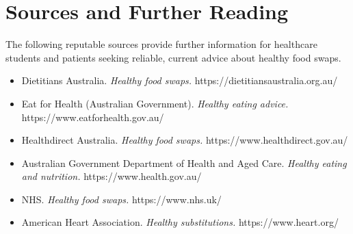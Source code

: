 \section*{Sources and Further Reading}
The following reputable sources provide further information for healthcare students and patients seeking reliable, current advice about healthy food swaps.

\begin{itemize}
    \item Dietitians Australia. \textit{Healthy food swaps.} https://dietitiansaustralia.org.au/
    \item Eat for Health (Australian Government). \textit{Healthy eating advice.} https://www.eatforhealth.gov.au/
    \item Healthdirect Australia. \textit{Healthy food swaps.} https://www.healthdirect.gov.au/
    \item Australian Government Department of Health and Aged Care. \textit{Healthy eating and nutrition.} https://www.health.gov.au/
    \item NHS. \textit{Healthy food swaps.} https://www.nhs.uk/
    \item American Heart Association. \textit{Healthy substitutions.} https://www.heart.org/
\end{itemize}
